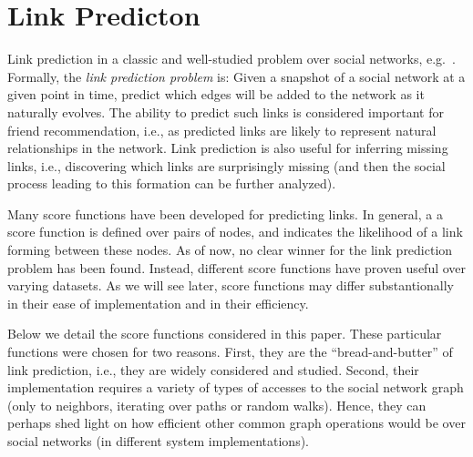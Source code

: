 \newcommand{\score}[1]{{\mathrm {#1}}}

\section{Link Predicton}

Link prediction in a classic and well-studied problem over social
networks, e.g.~\cite{}. Formally, the {\em link prediction problem\/}
is: Given a snapshot of a social network at a given point in time,
predict which edges will be added to the network as it naturally
evolves. The ability to predict such links is considered important for
friend recommendation, i.e., as predicted links are likely to
represent natural relationships in the network. Link prediction is
also useful for inferring missing links, i.e., discovering which links
are surprisingly missing (and then the social process leading to this
formation can be further analyzed). 

Many score functions have been developed for predicting links. In general, a
a score function is defined over pairs of nodes, and indicates
the likelihood of a link forming between these nodes. As of now, no
clear winner for the link prediction problem has been found. Instead,
different score functions have proven useful over varying datasets. As we will
see later, score functions may differ substantionally in their ease of
implementation and in their efficiency.

Below we detail the score functions considered in this paper. These particular
functions were chosen for two reasons. First, they are  the
``bread-and-butter'' of link prediction, i.e., they are
widely considered and studied. Second, their implementation requires a
variety of types of accesses to the social network graph (only to
neighbors, iterating over paths or random walks). Hence, they can
perhaps shed light on how efficient other common graph operations
would be over social networks (in different system implementations). 


